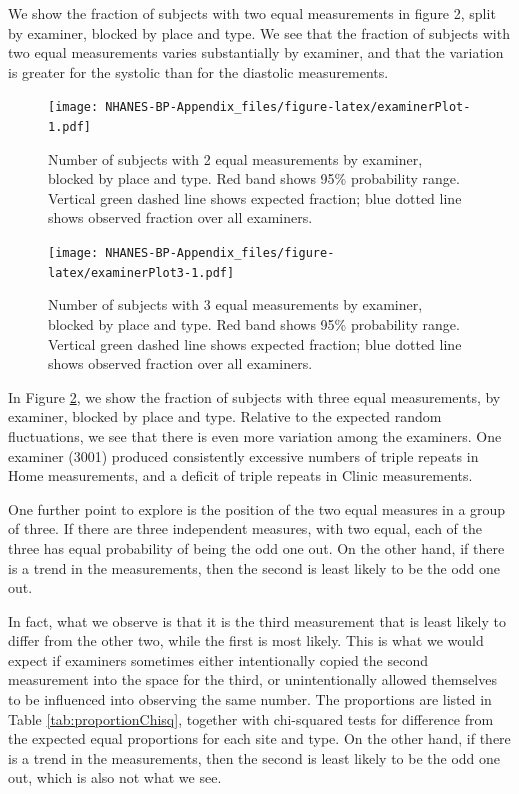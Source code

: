 \documentclass[
]{article}
\begin{document}
We show the fraction of subjects with two equal measurements in figure 2, split by examiner, blocked by place and type.
We see that the fraction of subjects with two equal measurements varies substantially by examiner, and that the variation is greater for the systolic than for the diastolic measurements.

\begin{figure}
\centering
\texttt{[image: NHANES-BP-Appendix\_files/figure-latex/examinerPlot-1.pdf]}
\caption{\label{fig:examinerPlot}Number of subjects with 2 equal measurements by examiner, blocked by place and type. Red band shows 95\% probability range. Vertical green dashed line shows expected fraction; blue dotted line shows observed fraction over all examiners.}
\end{figure}

\begin{figure}
\centering
\texttt{[image: NHANES-BP-Appendix\_files/figure-latex/examinerPlot3-1.pdf]}
\caption{\label{fig:examinerPlot3}Number of subjects with 3 equal measurements by examiner, blocked by place and type. Red band shows 95\% probability range. Vertical green dashed line shows expected fraction; blue dotted line shows observed fraction over all examiners.}
\end{figure}

In Figure \ref{fig:examinerPlot3}, we show the fraction of subjects with three equal measurements, by examiner, blocked by place and type.
Relative to the expected random fluctuations, we see that there is even more variation among the examiners.
One examiner (3001) produced consistently excessive numbers of triple repeats in Home measurements, and a deficit of triple repeats in Clinic measurements.

One further point to explore is the position of the two equal measures in a group of three.
If there are three independent measures, with two equal, each of the three has equal probability of being the odd one out.
On the other hand, if there is a trend in the measurements, then the second is least likely to be the odd one out.

In fact, what we observe is that it is the third measurement that is least likely to differ from the other two, while the first is most likely.
This is what we would expect if examiners sometimes either intentionally copied the second measurement into the space for the third, or unintentionally allowed themselves to be influenced into observing the same number.
The proportions are listed in Table \ref{tab:proportionChisq}, together with chi-squared tests for difference from the expected equal proportions for each site and type.
On the other hand, if there is a trend in the measurements, then the second is least likely to be the odd one out, which is also not what we see.
\end{document}
